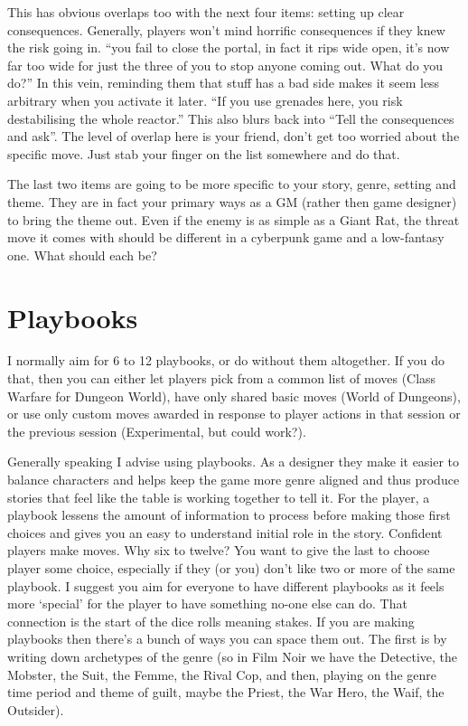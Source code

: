 \documentclass{tufte-handout}
\begin{document}
This has obvious overlaps too with the next four items: setting up clear consequences. Generally, players won't mind horrific consequences if they knew the risk going in. ``you fail to close the portal, in fact it rips wide open, it's now far too wide for just the three of you to stop anyone coming out. What do you do?'' In this vein, reminding them that stuff has a bad side makes it seem less arbitrary when you activate it later. ``If you use grenades here, you risk destabilising the whole reactor.'' This also blurs back into ``Tell the consequences and ask''.  The level of overlap here is your friend, don't get too worried about the specific move. Just stab your finger on the list somewhere and do that.

The last two items are going to be more specific to your story, genre, setting and theme. They are in fact your primary ways as a GM (rather then game designer) to bring the theme out.  Even if the enemy is as simple as a Giant Rat, the threat move it comes with should be different in a cyberpunk game and a low-fantasy one. What should each be?

\section{Playbooks}
I normally aim for 6 to 12 playbooks, or do without them altogether. If you do that, then you can either let  players pick from a common list of moves (Class Warfare for Dungeon World), have only shared basic moves (World of Dungeons), or use only custom moves awarded in response to player actions in that session or the previous session (Experimental, but could work?).

Generally speaking I advise using playbooks. As a designer they make it easier to balance characters and helps keep the game more genre aligned and thus produce stories that feel like the table is working together to tell it. For the player, a playbook lessens the amount of information to process before making those first choices and gives you an easy to understand initial role in the story. Confident players make moves.
Why six to twelve? You want to give the last to choose player some choice, especially if they (or you) don't like two or more of the same playbook. I suggest you aim for everyone to have different playbooks as it feels more `special' for the player to have something no-one else can do. That connection is the start of the dice rolls meaning stakes.
If you are making playbooks then there's a bunch of ways you can space them out.  The first is by writing down archetypes of the genre (so in Film Noir we have the Detective, the Mobster, the Suit, the Femme, the Rival Cop, and then, playing on the genre time period and theme of guilt, maybe the Priest, the War Hero, the Waif, the Outsider). 
\end{document}
